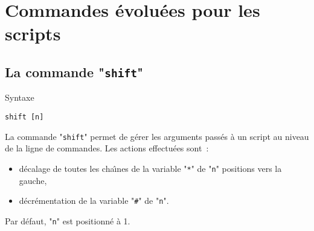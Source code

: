 %
%

\setcounter{remarque-cnt}{1}
\setcounter{example-cnt}{1}
\chapter{Commandes {\'e}volu{\'e}es pour les scripts}
\thispagestyle{fancy}

\section{\label{advcmds-shift}La commande "\texttt{shift}"}

\begin{definition}{Syntaxe}
\begin{verbatim}
shift [n]
\end{verbatim}
\end{definition}

La commande "\texttt{shift}" permet de g{\'e}rer les arguments pass{\'e}s {\`a} un
script au niveau de la ligne de commandes. Les actions effectu{\'e}es sont~:
\begin{itemize}
	\item	d{\'e}calage de toutes les cha{\^\i}nes de la variable "\texttt{*}"
			de "\texttt{n}" positions vers la gauche,
	\item	d{\'e}cr{\'e}mentation de la variable "\texttt{\#}" de "\texttt{n}".
\end{itemize}
Par d{\'e}faut, "\texttt{n}" est positionn{\'e} {\`a} 1.

